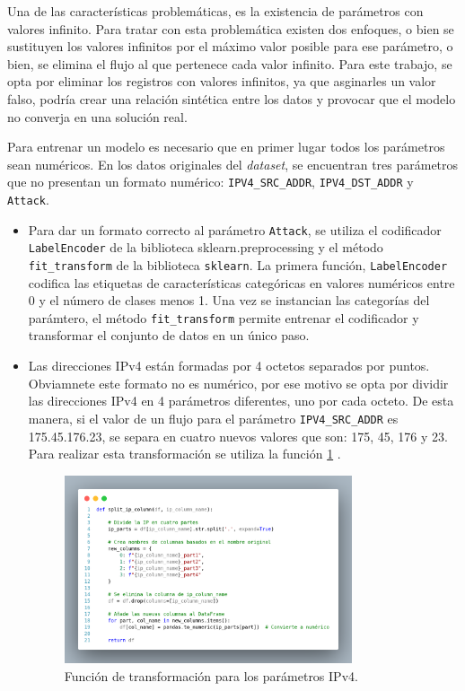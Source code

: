 Una de las características problemáticas, es la existencia de parámetros con valores infinito. Para tratar con esta problemática existen dos enfoques, o bien se sustituyen los valores infinitos por el máximo valor posible para ese parámetro, o bien, se elimina el flujo al que pertenece cada valor infinito. Para este trabajo, se opta por eliminar los registros con valores infinitos, ya que asginarles un valor falso, podría crear una relación sintética entre los datos y provocar que el modelo no converja en una solución real.

Para entrenar un modelo es necesario que en primer lugar todos los parámetros sean numéricos. En los datos originales del \textit{dataset}, se encuentran tres parámetros que no presentan un formato numérico: \texttt{IPV4\_SRC\_ADDR}, \texttt{IPV4\_DST\_ADDR} y \texttt{Attack}.

\begin{itemize}
	\item Para dar un formato correcto al parámetro \texttt{Attack}, se utiliza el codificador \texttt{LabelEncoder} de la biblioteca sklearn.preprocessing y el método \texttt{fit\_transform} de la biblioteca \texttt{sklearn}. La primera función, \texttt{LabelEncoder} codifica las etiquetas de características categóricas en valores numéricos entre 0 y el número de clases menos 1. Una vez se instancian las categorías del parámtero, el método \texttt{fit\_transform} permite entrenar el codificador y transformar el conjunto de datos en un único paso.
	\item Las direcciones IPv4 están formadas por 4 octetos separados por puntos. Obviamnete este formato no es numérico, por ese motivo se opta por dividir las direcciones IPv4 en 4 parámetros diferentes, uno por cada octeto. De esta manera, si el valor de un flujo para el parámetro \texttt{IPV4\_SRC\_ADDR} es 175.45.176.23, se separa en cuatro nuevos valores que son: 175, 45, 176 y 23. Para realizar esta transformación se utiliza la función \ref{fig:funIPv4} .
\begin{figure}[H]
    \centering
    \includegraphics[width=0.8\textwidth]{./img/ent-datos/funIPv4.png}
    \caption{Función de transformación para los parámetros IPv4.}
    \label{fig:funIPv4}
\end{figure}

\end{itemize}

